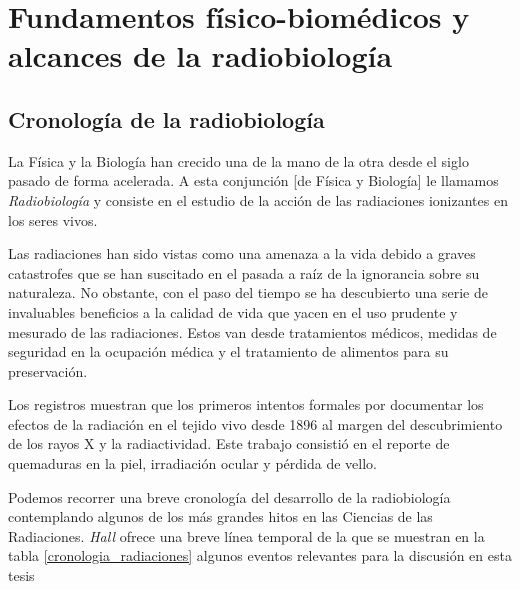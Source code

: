 \documentclass[12pt,letterpaper, oneside]{book}
\begin{document}
	\chapter{Fundamentos físico-biomédicos y alcances de la radiobiología}
		\section{Cronología de la radiobiología} %
		La Física y la Biología han crecido una de la mano de la otra desde el siglo pasado de forma acelerada. A esta conjunción [de Física y Biología] le llamamos \textit{Radiobiología} y consiste en el estudio de la acción de las radiaciones ionizantes en los seres vivos\cite{Hall.2000}. 
		
		Las radiaciones han sido vistas como una amenaza a la vida debido a graves catastrofes que se han suscitado en el pasada a raíz de la ignorancia sobre su naturaleza\cite{Prasad.1995}. No obstante, con el paso del tiempo se ha descubierto una serie de invaluables beneficios a la calidad de vida que yacen en el uso prudente y mesurado de las radiaciones. Estos van desde tratamientos médicos, medidas de seguridad en la ocupación médica y el tratamiento de alimentos para su preservación\cite{Prasad.1995}. 
		
		Los registros muestran que los primeros intentos formales por documentar los efectos de la radiación en el tejido vivo desde 1896 al margen del descubrimiento de los rayos X y la radiactividad\cite{Hall.2000}. Este trabajo consistió en el reporte de quemaduras en la piel, irradiación ocular y pérdida de vello. 
		
		Podemos recorrer una breve cronología del desarrollo de la radiobiología contemplando algunos de los más grandes hitos en las Ciencias de las Radiaciones. \textit{Hall} ofrece una breve línea temporal de la que se muestran en la tabla \ref{cronologia_radiaciones} algunos eventos relevantes para la discusión en esta tesis
		
\end{document}
